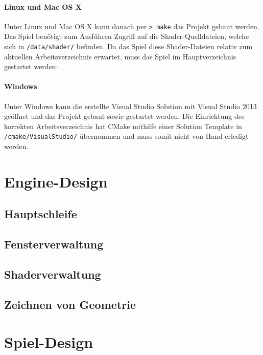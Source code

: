 \documentclass[12pt, a4paper, titlepage, hidelinks]{scrreprt}
\begin{document}
\paragraph{Linux und Mac OS X}
Unter Linux und Mac OS X kann danach per \texttt{>~make} das Projekt gebaut werden. Das Spiel benötigt zum Ausführen Zugriff auf die Shader-Quelldateien, welche sich in \texttt{/data/shader/} befinden. Da das Spiel diese Shader-Dateien relativ zum aktuellen Arbeitsverzeichnis erwartet, muss das Spiel im Hauptverzeichnis gestartet werden:

\paragraph{Windows}
Unter Windows kann die erstellte Visual Studio Solution mit Visual Studio 2013 geöffnet und das Projekt gebaut sowie gestartet werden. Die Einrichtung des korrekten Arbeitsverzeichnis hat CMake mithilfe einer Solution Template in \texttt{/cmake/VisualStudio/} übernommen und muss somit nicht von Hand erledigt werden.

\section{Engine-Design}
\subsection{Hauptschleife}


\subsection{Fensterverwaltung}
\subsection{Shaderverwaltung}


\subsection{Zeichnen von Geometrie}


\section{Spiel-Design}
\end{document}
